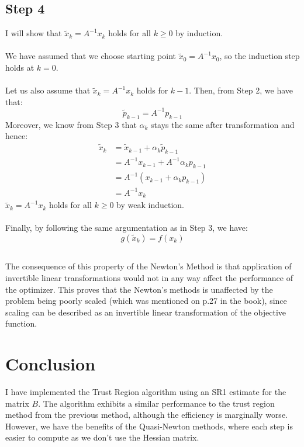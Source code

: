 \documentclass[a4paper]{article}
\begin{document}
\subsection{Step 4}
I will show that $\tilde{x}_k = A^{-1}x_k$ holds for all
$k\geq 0$ by induction. \\\\
We have assumed that we choose starting point $\tilde{x}_0 = A^{-1}x_0$, so the
induction step holds at $k=0$.\\\\
Let us also assume that $\tilde{x}_k = A^{-1}x_k$ holds for $k-1$. Then, from
Step 2, we have that:
\[
\tilde{p}_{k-1} = A^{-1}p_{k-1}
\]
Moreover, we know from Step 3 that $\alpha_k$ stays the same after
transformation and hence:
\[
\begin{aligned}
  \tilde{x}_{k}
  &= \tilde{x}_{k-1} + \alpha_k \tilde{p}_{k-1}\\
  &= A^{-1}x_{k-1} + A^{-1}\alpha_k p_{k-1}\\
  &= A^{-1}(x_{k-1} + \alpha_k p_{k-1})\\
  &= A^{-1}x_k
\end{aligned}
\]
$\tilde{x}_k = A^{-1}x_k$ holds for all $k\geq 0$ by weak induction.\\\\
Finally, by following the same argumentation as in Step 3, we have:
\[
  g(\tilde{x}_k)= f(x_k)
\]

\subsection{}
The consequence of this property of the Newton's Method is that application of
invertible linear transformations would not in any way affect the performance of
the optimizer. This proves that the Newton's methods is unaffected by the
problem being poorly scaled (which was mentioned on p.27 in the book), since
scaling can be described as an invertible linear transformation of the objective function.

\section{Conclusion}
I have implemented the Trust Region algorithm using an SR1 estimate for the
matrix $B$. The algorithm exhibits a similar performance to the trust region
method from the previous method, although the efficiency is marginally worse.
However, we have the benefits of the Quasi-Newton methods, where each step is
easier to compute as we don't use the Hessian matrix.
\end{document}

